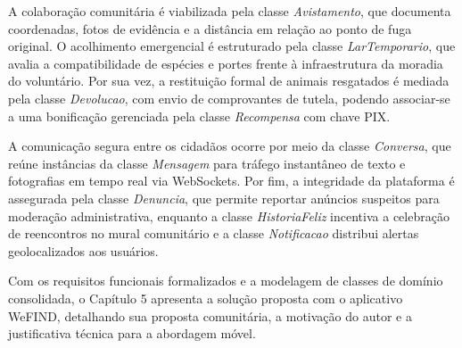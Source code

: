 A colaboração comunitária é viabilizada pela classe \textit{Avistamento}, que documenta coordenadas, fotos de evidência e a distância em relação ao ponto de fuga original. O acolhimento emergencial é estruturado pela classe \textit{LarTemporario}, que avalia a compatibilidade de espécies e portes frente à infraestrutura da moradia do voluntário. Por sua vez, a restituição formal de animais resgatados é mediada pela classe \textit{Devolucao}, com envio de comprovantes de tutela, podendo associar-se a uma bonificação gerenciada pela classe \textit{Recompensa} com chave PIX.

A comunicação segura entre os cidadãos ocorre por meio da classe \textit{Conversa}, que reúne instâncias da classe \textit{Mensagem} para tráfego instantâneo de texto e fotografias em tempo real via WebSockets. Por fim, a integridade da plataforma é assegurada pela classe \textit{Denuncia}, que permite reportar anúncios suspeitos para moderação administrativa, enquanto a classe \textit{HistoriaFeliz} incentiva a celebração de reencontros no mural comunitário e a classe \textit{Notificacao} distribui alertas geolocalizados aos usuários.

Com os requisitos funcionais formalizados e a modelagem de classes de domínio consolidada, o Capítulo 5 apresenta a solução proposta com o aplicativo WeFIND, detalhando sua proposta comunitária, a motivação do autor e a justificativa técnica para a abordagem móvel.

\clearpage
